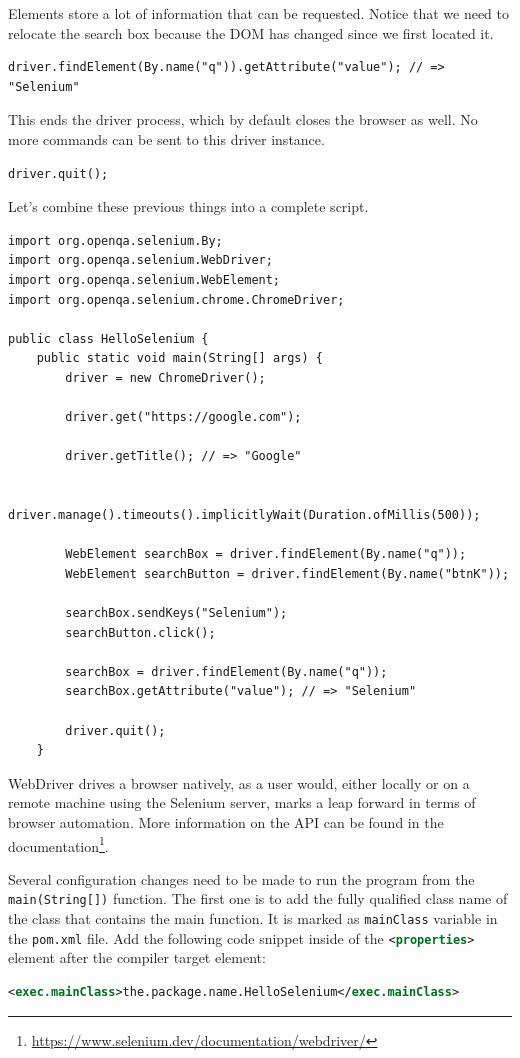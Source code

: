 Elements store a lot of information that can be requested. Notice that we need to relocate the search box because the DOM has changed since we first located it.
\begin{lstlisting}
driver.findElement(By.name("q")).getAttribute("value"); // => "Selenium"
\end{lstlisting}

This ends the driver process, which by default closes the browser as well. No more commands can be sent to this driver instance.
\begin{lstlisting}
driver.quit();
\end{lstlisting}

Let’s combine these previous things into a complete script.
\begin{lstlisting}
import org.openqa.selenium.By;
import org.openqa.selenium.WebDriver;
import org.openqa.selenium.WebElement;
import org.openqa.selenium.chrome.ChromeDriver;

public class HelloSelenium {
    public static void main(String[] args) {
        driver = new ChromeDriver();

        driver.get("https://google.com");
        
        driver.getTitle(); // => "Google"

        driver.manage().timeouts().implicitlyWait(Duration.ofMillis(500));
        
        WebElement searchBox = driver.findElement(By.name("q"));
        WebElement searchButton = driver.findElement(By.name("btnK"));
        
        searchBox.sendKeys("Selenium");
        searchButton.click();
        
        searchBox = driver.findElement(By.name("q"));
        searchBox.getAttribute("value"); // => "Selenium"
        
        driver.quit();
    }
\end{lstlisting}

WebDriver drives a browser natively, as a user would, either locally or on a remote machine using the Selenium server, marks a leap forward in terms of browser automation. More information on the API can be found in the documentation\footnote{\url{https://www.selenium.dev/documentation/webdriver/}}.

Several configuration changes need to be made to run the program from the \lstinline!main(String[])! function. The first one is to add the fully qualified class name of the class that contains the main function. It is marked as \lstinline!mainClass! variable in the \lstinline!pom.xml! file. Add the following code snippet inside of the \lstinline[language=XML]!<properties>! element after the compiler target element:
\begin{lstlisting}[language=XML]
<exec.mainClass>the.package.name.HelloSelenium</exec.mainClass>
\end{lstlisting}

